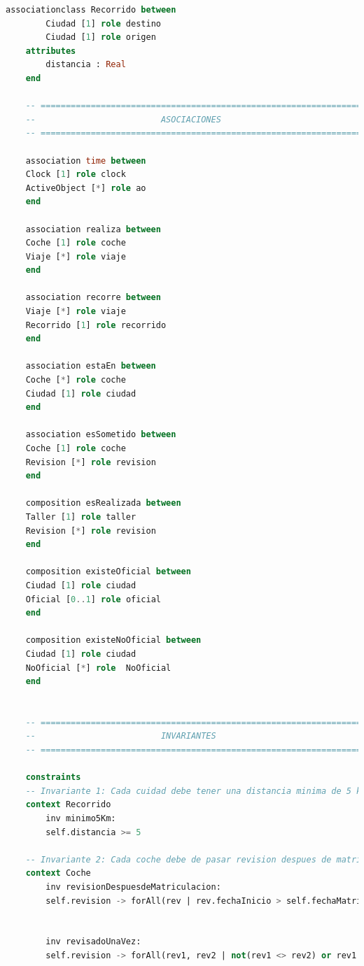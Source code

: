 \documentclass[12pt.a4paper]{article}
\begin{document}
\begin{lstlisting}[style = useNormal,language=SQL, caption={Codigo Use del apartado B}]
    associationclass Recorrido between
        Ciudad [1] role destino
        Ciudad [1] role origen
    attributes
        distancia : Real                         
    end 
    
    -- =====================================================================
    --                         ASOCIACIONES 
    -- =====================================================================
    
    association time between
    Clock [1] role clock
    ActiveObject [*] role ao
    end
    
    association realiza between
    Coche [1] role coche
    Viaje [*] role viaje
    end
    
    association recorre between
    Viaje [*] role viaje
    Recorrido [1] role recorrido
    end
    
    association estaEn between
    Coche [*] role coche
    Ciudad [1] role ciudad
    end
    
    association esSometido between
    Coche [1] role coche
    Revision [*] role revision
    end
    
    composition esRealizada between
    Taller [1] role taller
    Revision [*] role revision
    end
    
    composition existeOficial between
    Ciudad [1] role ciudad
    Oficial [0..1] role oficial
    end
    
    composition existeNoOficial between
    Ciudad [1] role ciudad
    NoOficial [*] role  NoOficial
    end
    
    
    -- =====================================================================
    --                         INVARIANTES
    -- =====================================================================
    
    constraints
    -- Invariante 1: Cada cuidad debe tener una distancia minima de 5 km de la otra.
    context Recorrido
        inv minimo5Km:
        self.distancia >= 5
    
    -- Invariante 2: Cada coche debe de pasar revision despues de matricularse y no antes.
    context Coche
        inv revisionDespuesdeMatriculacion:
        self.revision -> forAll(rev | rev.fechaInicio > self.fechaMatriculacion)
    

        inv revisadoUnaVez:
        self.revision -> forAll(rev1, rev2 | not(rev1 <> rev2) or rev1.fechaInicio <> rev2.fechaInicio and (rev1.fechaInicio >= rev2.fechaFin or rev2.fechaInicio >= rev1.fechaFin) and (not(rev1.fechaFin = null and rev2.fechaFin = null)))
    

\end{lstlisting}
\end{document}
